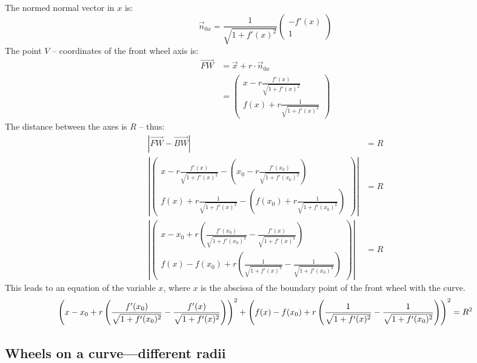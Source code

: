 \documentclass[11pt,english,BCOR=10mm,DIV=12,bibliography=totoc,parskip=false,headings=small,
    headinclude=false,footinclude=false,oneside]{pst-doc}
\begin{document}
The normed normal vector in $x$ is:
\begin{equation*}
\vec{n}_{0x}=\frac{1}{\sqrt{1+f'(x)^2}}
\begin{pmatrix}
-f'(x)\\
1
\end{pmatrix}
\end{equation*}
The point $V$ -- coordinates of the front wheel axis is:
\begin{align*}
\overrightarrow{FW}&=\vec{x}+r\cdot \vec{n}_{0x}\\
&=\begin{pmatrix}
x-r\frac{f'(x)}{\sqrt{1+f'(x)^2}}\\
f(x)+r\frac{1}{\sqrt{1+f'(x)^2}}
\end{pmatrix}
\end{align*}
The distance between the axes is $R$ -- thus:
\begin{align*}
|\overrightarrow{FW}-\overrightarrow{BW}|&=R\\
\left|
\begin{pmatrix}
x-r\frac{f'(x)}{\sqrt{1+f'(x)^2}}-\left(x_0-r\frac{f'(x_0)}{\sqrt{1+f'(x_0)^2}}\right)\\
f(x)+r\frac{1}{\sqrt{1+f'(x)^2}}-\left(f(x_0)+r\frac{1}{\sqrt{1+f'(x_0)^2}}\right)
\end{pmatrix}
\right|&=R\\
\left|\begin{pmatrix}
x-x_0+r\left(\frac{f'(x_0)}{\sqrt{1+f'(x_0)^2}}-\frac{f'(x)}{\sqrt{1+f'(x)^2}}\right)\\
f(x)-f(x_0)+r\left(\frac{1}{\sqrt{1+f'(x)^2}}-\frac{1}{\sqrt{1+f'(x_0)^2}}\right)
\end{pmatrix}
\right|&=R
\end{align*}
This leads to an equation of the variable $x$, where $x$ is the abscissa of the boundary point of the front wheel with the curve.
\begin{equation*}
\left(x-x_0+r\left(\frac{f'(x_0)}{\sqrt{1+f'(x_0)^2}}-\frac{f'(x)}{\sqrt{1+f'(x)^2}}\right)\right)^2+\left(f(x)-f(x_0)+r\left(\frac{1}{%
\sqrt{1+f'(x)^2}}-\frac{1}{\sqrt{1+f'(x_0)^2}}\right)\right)^2=R^2
\end{equation*}





\subsection{Wheels on a curve---different radii}
\end{document}

